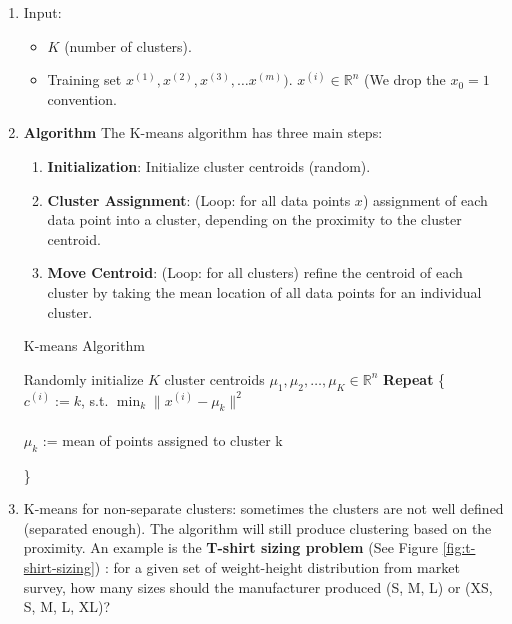     \begin{enumerate}
        \item Input: 
            \begin{itemize}
                \item $K$ (number of clusters).
                \item Training set ${x^{(1)}, x^{(2)},x^{(3)}, \dots x^{(m)})}$. $x^{(i)} \in \mathbb{R}^n$ (We drop the $x_0 = 1$ convention.
            \end{itemize}
        \item \textbf{Algorithm} The K-means algorithm has three main steps:
            \begin{enumerate}
                \item \textbf{Initialization}: Initialize cluster centroids (random).
                \item \textbf{Cluster Assignment}: (Loop: for all data points $x$) assignment of each data point into a cluster, depending on the proximity to the cluster centroid.
                \item  \textbf{Move Centroid}: (Loop: for all clusters) refine the centroid of each cluster by taking the mean location of all data points for an individual cluster.
            \end{enumerate}
            \begin{algorithm}[H]
            \caption*{K-means Algorithm}
            \begin{algorithmic}
                \STATE  Randomly initialize $K$ cluster centroids $\mu_1, \mu_2, \dots, \mu_K \in \mathbb{R}^n$ 
                \STATE \textbf{Repeat} \{
                \bindent
                \STATE $c^{(i)} := k$, s.t. $\min_{k} \| x^{(i)} - \mu_k \| ^2 $ \\
                \ENDFOR
                \eindent
                \\ 
                \bindent
                \STATE $\mu_k$ := mean of points assigned to cluster k \\
                \ENDFOR
                \eindent

            \STATE \}
            \end{algorithmic}
            \end{algorithm}
        \item K-means for non-separate clusters: sometimes the clusters are not well defined (separated enough). The algorithm will still produce clustering based on the proximity. An example is the \textbf{T-shirt sizing problem} (See Figure \ref{fig:t-shirt-sizing}) : for a given set of weight-height distribution from market survey, how many sizes should the manufacturer produced (S, M, L) or (XS, S, M, L, XL)?
    \end{enumerate}
